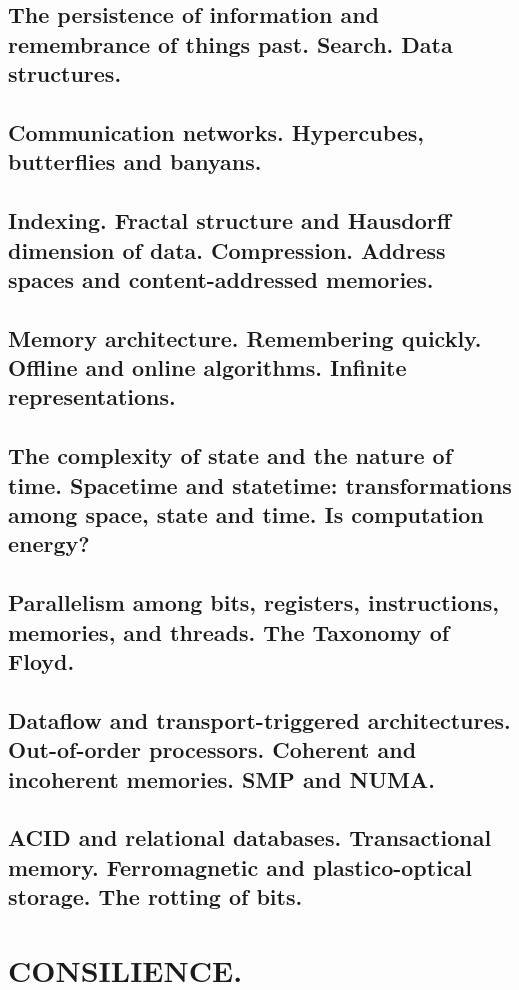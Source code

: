 \documentclass[letterpaper,draft]{memoir}
\begin{document}
\chapter{The persistence of information and remembrance of things past. Search. Data structures.}

\chapter{Communication networks. Hypercubes, butterflies and banyans.}

\chapter{Indexing. Fractal structure and Hausdorff dimension of data. Compression.
Address spaces and content-addressed memories.}

\chapter{Memory architecture. Remembering quickly. Offline and online algorithms.
Infinite representations.}

\chapter{The complexity of state and the nature of time. Spacetime and statetime:
transformations among space, state and time. Is computation energy?}

\chapter{Parallelism among bits, registers, instructions, memories, and threads. The
Taxonomy of Floyd.}

\chapter{Dataflow and transport-triggered architectures. Out-of-order processors.
Coherent and incoherent memories. SMP and NUMA.}

\chapter{ACID and relational databases. Transactional memory. Ferromagnetic and
plastico-optical storage. The rotting of bits.}

\part{CONSILIENCE.}
\end{document}
